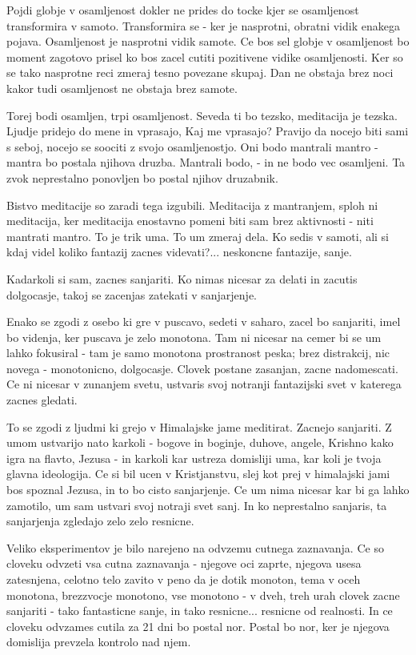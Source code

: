 Pojdi globje v osamljenost dokler ne prides do tocke kjer se osamljenost transformira v samoto. Transformira se - ker je nasprotni, obratni vidik enakega pojava. Osamljenost je nasprotni vidik samote. Ce bos sel globje v osamljenost bo moment zagotovo prisel ko bos zacel cutiti pozitivene vidike osamljenosti. Ker so se tako nasprotne reci zmeraj tesno povezane skupaj. Dan ne obstaja brez noci kakor tudi osamljenost ne obstaja brez samote. 

Torej bodi osamljen, trpi osamljenost. Seveda ti bo tezsko, meditacija je tezska. Ljudje pridejo do mene in vprasajo,  Kaj me vprasajo? Pravijo da nocejo biti sami s seboj, nocejo se soociti z svojo osamljenostjo. Oni bodo mantrali mantro - mantra bo postala njihova druzba. Mantrali bodo,  - in ne bodo vec osamljeni. Ta zvok  neprestalno ponovljen bo postal njihov druzabnik. 

Bistvo meditacije so zaradi tega izgubili. Meditacija z mantranjem, sploh ni meditacija, ker meditacija enostavno pomeni biti sam brez aktivnosti - niti mantrati mantro. To je trik uma. To um zmeraj dela. Ko sedis v samoti, ali si kdaj videl koliko fantazij zacnes videvati?... neskoncne fantazije, sanje. 

Kadarkoli si sam, zacnes sanjariti. Ko nimas nicesar za delati in zacutis dolgocasje, takoj se zacenjas zatekati v sanjarjenje. 

Enako se zgodi z osebo ki gre v puscavo, sedeti v saharo, zacel bo sanjariti, imel bo videnja, ker puscava je zelo monotona. Tam ni nicesar na cemer bi se um lahko fokusiral - tam je samo monotona prostranost peska; brez distrakcij, nic novega - monotonicno, dolgocasje. Clovek postane zasanjan, zacne nadomescati. Ce ni nicesar v zunanjem svetu, ustvaris svoj notranji fantazijski svet v katerega zacnes gledati. 

To se zgodi z ljudmi ki grejo v Himalajske jame meditirat. Zacnejo sanjariti. Z umom ustvarijo nato karkoli - bogove in boginje, duhove, angele, Krishno kako igra na flavto, Jezusa - in karkoli kar ustreza domisliji uma, kar koli je tvoja glavna ideologija. Ce si bil ucen v Kristjanstvu, slej kot prej v himalajski jami bos spoznal Jezusa, in to bo cisto sanjarjenje. Ce um nima nicesar kar bi ga lahko zamotilo, um sam ustvari svoj notraji svet sanj. In ko neprestalno sanjaris, ta sanjarjenja zgledajo zelo zelo resnicne. 

Veliko eksperimentov je bilo narejeno na odvzemu cutnega zaznavanja. Ce so cloveku odvzeti vsa cutna zaznavanja - njegove oci zaprte, njegova usesa zatesnjena, celotno telo zavito v peno da je dotik monoton, tema v oceh monotona, brezzvocje monotono, vse monotono - v dveh, treh urah clovek zacne sanjariti - tako fantasticne sanje, in tako resnicne... resnicne od realnosti. In ce cloveku odvzames cutila za 21 dni bo postal nor. Postal bo nor, ker je njegova domislija prevzela kontrolo nad njem. 

